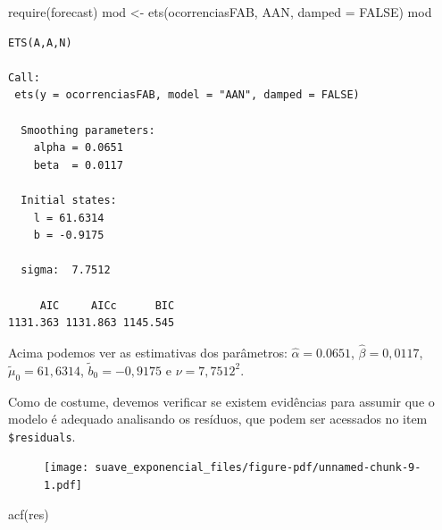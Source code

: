 \documentclass[
  letterpaper,
  DIV=11,
  numbers=noendperiod]{scrartcl}
\newenvironment{Shaded}{\begin{snugshade}}{\end{snugshade}}
\newcommand{\AttributeTok}[1]{\textcolor[rgb]{0.40,0.45,0.13}{#1}}
\newcommand{\ConstantTok}[1]{\textcolor[rgb]{0.56,0.35,0.01}{#1}}
\newcommand{\FunctionTok}[1]{\textcolor[rgb]{0.28,0.35,0.67}{#1}}
\newcommand{\NormalTok}[1]{\textcolor[rgb]{0.00,0.23,0.31}{#1}}
\newcommand{\OtherTok}[1]{\textcolor[rgb]{0.00,0.23,0.31}{#1}}
\newcommand{\SpecialCharTok}[1]{\textcolor[rgb]{0.37,0.37,0.37}{#1}}
\newcommand{\StringTok}[1]{\textcolor[rgb]{0.13,0.47,0.30}{#1}}
\theoremstyle{plain}
\theoremstyle{plain}
\theoremstyle{definition}
\theoremstyle{definition}
\theoremstyle{remark}
\begin{document}
\begin{Shaded}
\begin{Highlighting}[]
\FunctionTok{require}\NormalTok{(forecast)}
\NormalTok{mod }\OtherTok{\textless{}{-}} \FunctionTok{ets}\NormalTok{(ocorrenciasFAB, }\StringTok{\textquotesingle{}AAN\textquotesingle{}}\NormalTok{, }\AttributeTok{damped =} \ConstantTok{FALSE}\NormalTok{)}
\NormalTok{mod}
\end{Highlighting}
\end{Shaded}

\begin{verbatim}
ETS(A,A,N) 

Call:
 ets(y = ocorrenciasFAB, model = "AAN", damped = FALSE) 

  Smoothing parameters:
    alpha = 0.0651 
    beta  = 0.0117 

  Initial states:
    l = 61.6314 
    b = -0.9175 

  sigma:  7.7512

     AIC     AICc      BIC 
1131.363 1131.863 1145.545 
\end{verbatim}

Acima podemos ver as estimativas dos parâmetros:
\(\hat{\alpha}=0.0651\), \(\hat{\beta}=0,0117\),
\(\tilde{\mu}_0=61,6314\), \(\tilde{b}_0=-0,9175\) e \(\nu=7,7512^2\).

Como de costume, devemos verificar se existem evidências para assumir
que o modelo é adequado analisando os resíduos, que podem ser acessados
no item \texttt{\$residuals}.

\begin{Shaded}
\end{Shaded}

\begin{figure}[H]

{\centering \texttt{[image: suave\_exponencial\_files/figure-pdf/unnamed-chunk-9-1.pdf]}

}

\end{figure}

\begin{Shaded}
\begin{Highlighting}[]
\FunctionTok{acf}\NormalTok{(res)}
\end{Highlighting}
\end{Shaded}
\end{document}
